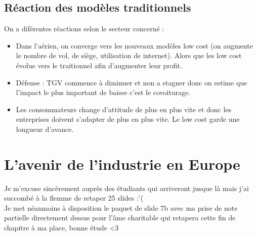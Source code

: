 \subsection{Réaction des modèles traditionnels}
On a diférentes réactions selon le secteur concerné :
\begin{itemize}
	\item Dans l'aérien, on converge vers les nouveaux modèles low cost (on augmente le nombre de vol, de siège, utilisation de internet). Alors que les low cost évolue vers le traitionnel afin d'augmenter leur profit.

	\item Défense : TGV commence à diminuer et non a stagner donc on estime que l’impact le plus important de  baisse c’est le covoiturage. 

	\item Les consommateurs change d’attitude de plus en plus vite et donc les entreprises doivent s’adapter de plus en plus vite. Le low cost garde une longueur d'avance. 
\end{itemize}

\section{L'avenir de l'industrie en Europe}
Je m'excuse sincèrement auprès des étudiants qui arriveront jusque là mais j'ai succombé à la flemme de retaper 25 slides :'( \\
Je met néanmoins à disposition le paquet de slide 7b avec ma prise de note partielle directement dessus pour l'âme charitable qui retapera cette fin de chapitre à ma place, bonne étude <3




